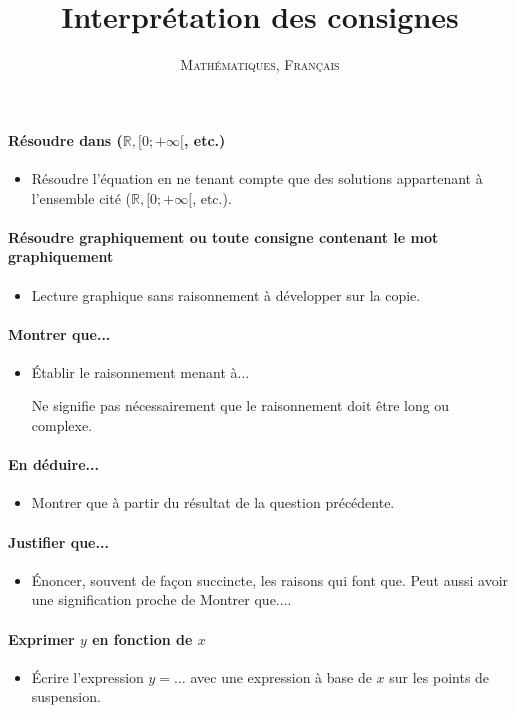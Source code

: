\documentclass[a4paper,12pt]{scrartcl}
\date{}
\title{Interprétation des consignes}
\author{\textsc{Mathématiques, Français}}
\begin{document}
\maketitle

\paragraph{\og{}Résoudre dans ($\mathbb{R}, [0;+\infty[$, etc.)\fg{}}
\begin{itemize}
 \item Résoudre l'équation en ne tenant compte que des solutions appartenant à l'ensemble cité ($\mathbb{R}, [0;+\infty[$, etc.). 
\end{itemize}


\paragraph{\og{}Résoudre graphiquement\fg{} ou toute consigne contenant le mot \og{}graphiquement\fg{}}
\begin{itemize}
 \item Lecture graphique sans raisonnement à développer sur la copie.
\end{itemize}


\paragraph{\og{}Montrer que...\fg{}}
\begin{itemize}
 \item Établir le raisonnement menant à...
 
 Ne signifie pas nécessairement que le raisonnement doit être long ou complexe.
\end{itemize}


\paragraph{\og{}En déduire...\fg{}}
\begin{itemize}
 \item \og{}Montrer que\fg{} à partir du résultat de la question précédente.
\end{itemize}


\paragraph{\og{}Justifier que...\fg{}}
\begin{itemize}
 \item Énoncer, souvent de façon succincte, les raisons qui font que. Peut aussi avoir une signification proche de \og{}Montrer que...\fg{}.
\end{itemize}


\paragraph{\og{}Exprimer $y$ en fonction de $x$\fg{}}
\begin{itemize}
 \item Écrire l'expression $y=\ldots$ avec une expression à base de $x$ sur les points de suspension.
\end{itemize}
\end{document}
